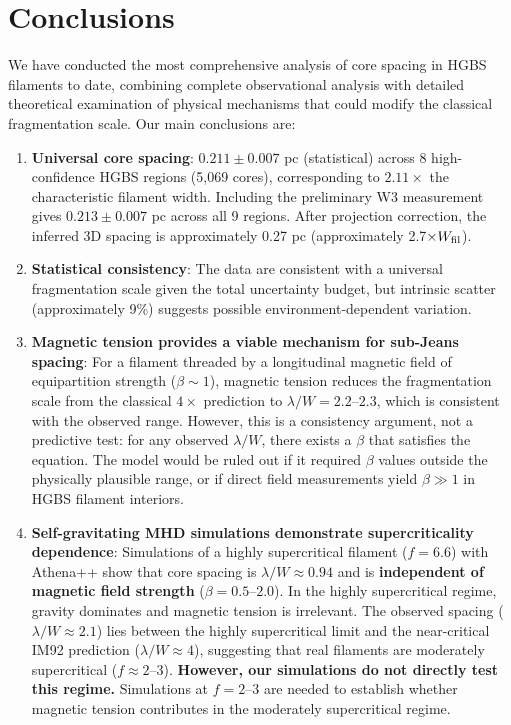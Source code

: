 \documentclass[11pt,a4paper]{article}
\begin{document}
\section{Conclusions}
\label{sec:conclusions}

We have conducted the most comprehensive analysis of core spacing in HGBS filaments to date, combining complete observational analysis with detailed theoretical examination of physical mechanisms that could modify the classical fragmentation scale. Our main conclusions are:

\begin{enumerate}
    \item \textbf{Universal core spacing}: $0.211 \pm 0.007$ pc (statistical) across 8 high-confidence HGBS regions (5,069 cores), corresponding to $2.11\times$ the characteristic filament width. Including the preliminary W3 measurement gives $0.213 \pm 0.007$ pc across all 9 regions. After projection correction, the inferred 3D spacing is approximately 0.27 pc (approximately 2.7$\times W_{\rm fil}$).

    \item \textbf{Statistical consistency}: The data are consistent with a universal fragmentation scale given the total uncertainty budget, but intrinsic scatter (approximately 9\%) suggests possible environment-dependent variation.

    \item \textbf{Magnetic tension provides a viable mechanism for sub-Jeans spacing}: For a filament threaded by a longitudinal magnetic field of equipartition strength ($\beta \sim 1$), magnetic tension reduces the fragmentation scale from the classical $4\times$ prediction to $\lambda/W = 2.2$--$2.3$, which is consistent with the observed range. However, this is a consistency argument, not a predictive test: for any observed $\lambda/W$, there exists a $\beta$ that satisfies the equation. The model would be ruled out if it required $\beta$ values outside the physically plausible range, or if direct field measurements yield $\beta \gg 1$ in HGBS filament interiors.

    \item \textbf{Self-gravitating MHD simulations demonstrate supercriticality dependence}: Simulations of a highly supercritical filament ($f = 6.6$) with Athena++ show that core spacing is $\lambda/W \approx 0.94$ and is \textbf{independent of magnetic field strength} ($\beta = 0.5$--$2.0$). In the highly supercritical regime, gravity dominates and magnetic tension is irrelevant. The observed spacing ($\lambda/W \approx 2.1$) lies between the highly supercritical limit and the near-critical IM92 prediction ($\lambda/W \approx 4$), suggesting that real filaments are moderately supercritical ($f \approx 2$--$3$). \textbf{However, our simulations do not directly test this regime.} Simulations at $f = 2$--$3$ are needed to establish whether magnetic tension contributes in the moderately supercritical regime.


\end{enumerate}
\end{document}

